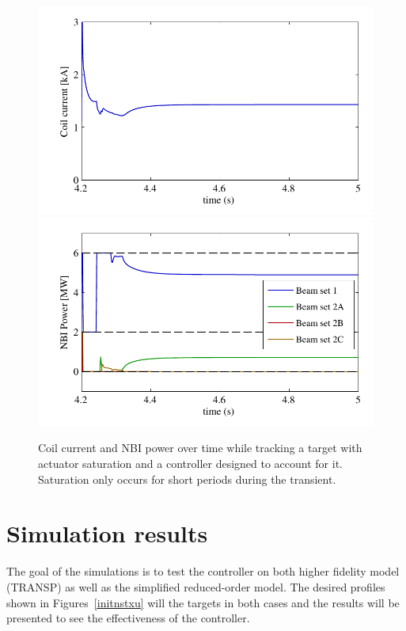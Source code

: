 \documentclass[12pt,lot, lof]{puthesis}
\begin{document}
\begin{figure}[htbp]
	\centering
	\includegraphics{chap10/good_u_sat_current}
	\includegraphics{chap10/good_u_sat_beams}
	\caption{Coil current and NBI power over time while tracking a target with actuator saturation and a controller designed to account for it.
		Saturation only occurs for short periods during the transient.}
	\label{fig:good_u_sat}
\end{figure}


\section{Simulation results} 

\label{results}

The goal of the simulations is to test the controller on both higher fidelity model (TRANSP) as well as the simplified reduced-order model.  The desired profiles shown in Figures~\ref{initnstxu} will the targets in both cases and the results will be presented to see the effectiveness of the controller.
\end{document}
